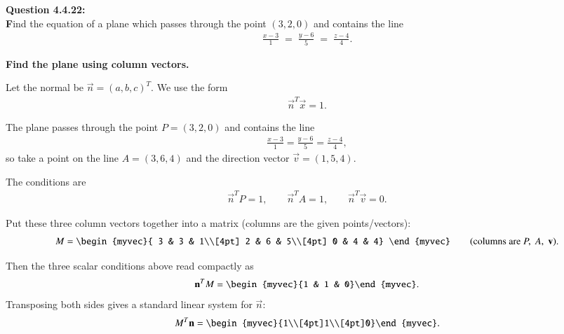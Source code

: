 \documentclass[journal]{IEEEtran}
\begin{document}



\textbf{Question 4.4.22:} \\
 \textbf Find the equation of a plane which passes through the point $(3,2,0)$ and contains the line
\begin{align}
\frac{x-3}{1} \;=\; \frac{y-6}{5} \;=\; \frac{z-4}{4}.
\end{align}


\textbf{Find the plane using column vectors.}

Let the normal be \(\vec{n}=(a,b,c)^T\). We use the form
\begin{align}
\vec{n}^T\vec{x}=1.
\end{align}

The plane passes through the point \(P=(3,2,0)\) and contains the line
\begin{align}
\frac{x-3}{1}=\frac{y-6}{5}=\frac{z-4}{4},
\end{align}
so take a point on the line \(A=(3,6,4)\) and the direction vector
\(\vec{v}=(1,5,4)\).

The conditions are
\begin{align}
\vec{n}^T P = 1,\qquad \vec{n}^T A = 1,\qquad \vec{n}^T \vec{v} = 0.
\end{align}

Put these three column vectors together into a matrix (columns are the given points/vectors):
\begin{align}
M=\begin{myvec}{
3 & 3 & 1\\[4pt]
2 & 6 & 5\\[4pt]
0 & 4 & 4}
\end{myvec}
\qquad\text{(columns are }P,\;A,\;\vec{v}\text{).}
\end{align}

Then the three scalar conditions above read compactly as
\begin{align}
\vec{n}^T M = \begin{myvec}{1 & 1 & 0}\end{myvec}.
\end{align}
Transposing both sides gives a standard linear system for \(\vec{n}\):
\begin{align}
M^T \vec{n} = \begin{myvec}{1\\[4pt]1\\[4pt]0}\end{myvec}.
\end{align}
\end{document}
